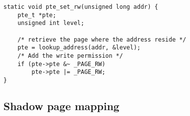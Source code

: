 \begin{lstlisting}[frame=single]
static void pte_set_rw(unsigned long addr) {
    pte_t *pte;
    unsigned int level;

    /* retrieve the page where the address reside */
    pte = lookup_address(addr, &level);
    /* Add the write permission */
    if (pte->pte &~ _PAGE_RW)
        pte->pte |= _PAGE_RW;
}
\end{lstlisting}

\subsection{Shadow page mapping}
\cite{write_protected}
